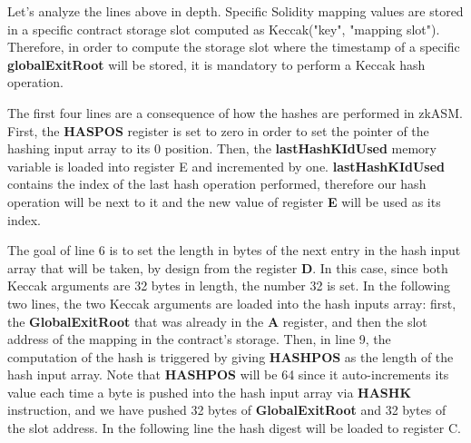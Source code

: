 
Let's analyze the lines above in depth. Specific Solidity mapping values are stored in a specific contract storage slot computed as Keccak("key", "mapping slot"). Therefore, in order to compute the storage slot where the timestamp of a specific \textbf{globalExitRoot} will be stored, it is mandatory to perform a Keccak hash operation.

The first four lines are a consequence of how the hashes are performed in zkASM. First, the \textbf{HASPOS} register is set to zero in order to set the pointer of the hashing input array to its 0 position. Then, the \textbf{lastHashKIdUsed} memory variable is loaded into register E and incremented by one. \textbf{lastHashKIdUsed} contains the index of the last hash operation performed, therefore our hash operation will be next to it and the new value of register \textbf{E} will be used as its index.

The goal of line 6 is to set the length in bytes of the next entry in the hash input array that will be taken, by design from the register \textbf{D}. In this case, since both Keccak arguments are 32 bytes in length, the number 32 is set. In the following two lines, the two Keccak arguments are loaded into the hash inputs array: first, the \textbf{GlobalExitRoot} that was already in the \textbf{A} register, and then the slot address of the mapping in the contract's storage. Then, in line 9, the computation of the hash is triggered by giving \textbf{HASHPOS} as the length of the hash input array. Note that \textbf{HASHPOS} will be 64 since it auto-increments its value each time a byte is pushed into the hash input array via \textbf{HASHK} instruction, and we have pushed 32 bytes of \textbf{GlobalExitRoot} and 32 bytes of the slot address. In the following line the hash digest will be loaded to register C.

